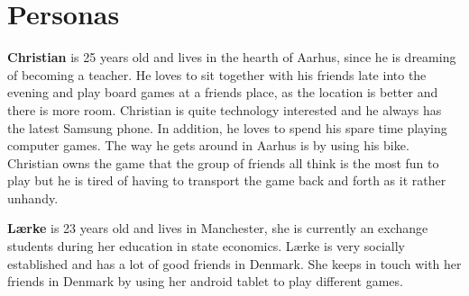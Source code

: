 \section{Personas}
\textbf{Christian} is 25 years old and lives in the hearth of Aarhus, since he is dreaming of becoming a teacher. He loves to sit together with his friends late into the evening and play board games at a friends place, as the location is better and there is more room. Christian is quite technology interested and he always has the latest Samsung phone. In addition, he loves to spend his spare time playing computer games. The way he gets around in Aarhus is by using his bike. Christian owns the game that the group of friends all think is the most fun to play but he is tired of having to transport the game back and forth as it rather unhandy.

\textbf{Lærke} is 23 years old and lives in Manchester, she is currently an exchange students during her education in state economics. Lærke is very socially established and has a lot of good friends in Denmark. She keeps in touch with her friends in Denmark by using her android tablet to play different games.